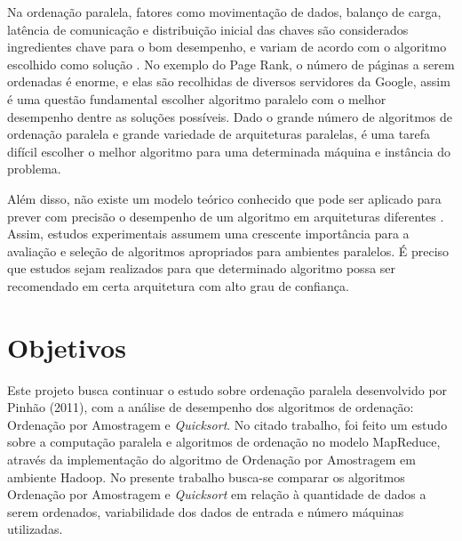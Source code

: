 


Na ordenação paralela, fatores como movimentação de dados, balanço de carga, latência de comunicação e distribuição inicial das chaves são considerados ingredientes chave para o bom desempenho, e variam de acordo com o algoritmo escolhido como solução \cite{Kale:2010}.  No exemplo do Page Rank, o número de páginas a serem ordenadas é enorme, e elas são recolhidas de diversos servidores da Google, assim é uma questão fundamental escolher algoritmo paralelo com o melhor desempenho dentre as soluções possíveis.
Dado o grande número de algoritmos de ordenação paralela e grande variedade de arquiteturas paralelas, é uma tarefa difícil escolher o melhor algoritmo para uma determinada máquina e instância do problema.

 Além disso, não existe um modelo teórico conhecido que pode ser aplicado para prever com precisão o desempenho de um algoritmo em arquiteturas diferentes \cite{Amato:1996}.
Assim, estudos experimentais assumem uma crescente importância para a avaliação e seleção de algoritmos apropriados para ambientes paralelos. É preciso que estudos sejam realizados para que determinado algoritmo possa ser recomendado em certa arquitetura com alto grau de confiança.

\section{Objetivos}


Este projeto busca continuar o estudo sobre ordenação paralela desenvolvido por Pinhão (2011), com a análise de desempenho dos algoritmos de ordenação: Ordenação por Amostragem e \textit{Quicksort}. No citado trabalho, foi feito um estudo sobre a computação paralela e algoritmos de ordenação no modelo MapReduce, através da implementação do algoritmo de Ordenação por Amostragem em ambiente Hadoop. 
No presente trabalho busca-se comparar os algoritmos Ordenação por Amostragem e \textit{Quicksort} em relação à quantidade de dados a serem ordenados, variabilidade dos dados de entrada e número máquinas utilizadas. 

